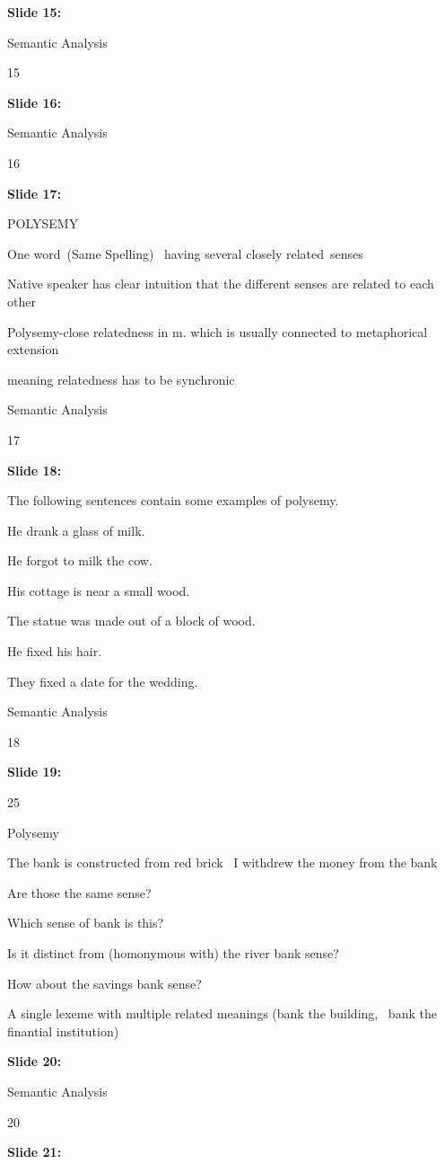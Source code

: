 \documentclass[11pt,a4paper]{article}
\begin{document}
\textbf{Slide 15:}

Semantic Analysis

15

\textbf{Slide 16:}

Semantic Analysis

16

\textbf{Slide 17:}

POLYSEMY

One word (Same Spelling)  having several closely related senses

Native speaker has clear intuition that the  different senses are related to each other

Polysemy-close relatedness in m. which is usually  connected to metaphorical extension

meaning relatedness has to be synchronic

Semantic Analysis

17

\textbf{Slide 18:}

The following sentences contain some examples of polysemy.

He drank a glass of milk.

He forgot to milk the cow.

His cottage is near a small wood.

The statue was made out of a block of wood.

He fixed his hair.

They fixed a date for the wedding.

Semantic Analysis

18

\textbf{Slide 19:}

25

Polysemy

The bank is constructed from red brick  I withdrew the money from the bank

Are those the same sense?

Which sense of bank is this?

Is it distinct from (homonymous with) the river bank sense?

How about the savings bank sense?

A single lexeme with multiple related meanings (bank the building,  bank the finantial institution)

\textbf{Slide 20:}

Semantic Analysis

20

\textbf{Slide 21:}
\end{document}
